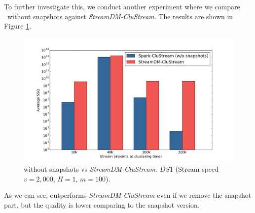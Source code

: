 To further investigate this, we conduct another experiment where we compare \our~without snapshots against \textit{StreamDM-CluStream}. The results are shown in Figure \ref{fig:comparisonNoSnaps}.
\begin{figure}[h]
 \centering
 \includegraphics[scale=0.24]{./styles/comparisonNoSnaps.png}
 \caption{\our without snapshots vs \textit{StreamDM-CluStream}. $DS1$ (Stream speed $v=2,000$, $H=1$, $m=100$).}
 \label{fig:comparisonNoSnaps}
\end{figure}
As we can see, \our outperforms \textit{StreamDM-CluStream} even if we remove the snapshot part, but the quality is lower comparing to the snapshot version.

